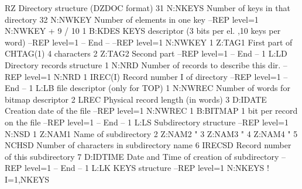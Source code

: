 \begin{XMPt}{RZ Directory structure (DZDOC format)}
 31        N:NKEYS  Number of keys in that directory                            
 32        N:NWKEY  Number of elements in one key                               
 --REP level=1  N:NWKEY + 9 / 10                                                
     1       B:KDES   KEYS descriptor (3 bits per el. ,10 keys per word)        
 --REP level=1 -- End --                                                        
 --REP level=1  N:NWKEY                                                         
     1       Z:TAG1   First part of CHTAG(1) 4 characters                       
     2       Z:TAG2   Second part                                               
 --REP level=1 -- End --                                                        
 1         L:LD     Directory records structure                                 
 1         N:NRD    Number of records to describe this dir.                     
 --REP level=1  N:NRD                                                           
     1       IREC(I)  Record number I of directory                              
 --REP level=1 -- End --                                                        
 1         L:LB     file descriptor (only for TOP)                              
 1         N:NWREC  Number of words for bitmap descriptor                       
 2         LREC     Physical record length (in words)                           
 3         D:IDATE  Creation date of the file                                   
 --REP level=1  N:NWREC                                                         
     1       B:BITMAP 1 bit per record on the file                              
 --REP level=1 -- End --                                                        
 1         L:LS     Subdirectory structure                                      
 --REP level=1  N:NSD                                                           
     1       Z:NAM1   Name of subdirectory                                      
     2       Z:NAM2   "                                                         
     3       Z:NAM3   "                                                         
     4       Z:NAM4   "                                                         
     5       NCHSD    Number of characters in subdirectory name                 
     6       IRECSD   Record number of this subdirectory                        
     7       D:IDTIME Date and Time of creation of subdirectory                 
 --REP level=1 -- End --                                                        
 1         L:LK     KEYS structure                                              
 --REP level=1  N:NKEYS ! I=1,NKEYS                                             

\end{XMPt}
